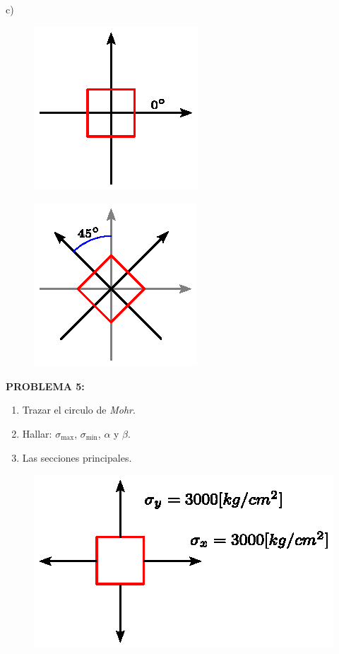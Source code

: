 \documentclass[letter,10pt,twoside]{article}
\begin{document}
c) 

\begin{figure}[H]
\centering
\includegraphics[scale=1.6]{resources/f42.eps}
\end{figure}

\begin{figure}[H]
\centering
\includegraphics[scale=1.6]{resources/f43.eps}
\end{figure}

\newpage

\colorbox{blue!25}{\textbf{PROBLEMA 5:}}

\begin{enumerate}[label=\alph*)]
    \item Trazar el circulo de \emph{Mohr}.
    \item Hallar: $\sigma_{\text{max}}$, $\sigma_{\text{min}}$, $\alpha$ y
        $\beta$.
    \item Las secciones principales.
\end{enumerate}

\begin{figure}[H]
\centering
\includegraphics[scale=1.2]{resources/f50.eps}
\end{figure}
\end{document}
